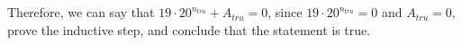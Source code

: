 \begin{enumerate}
\\
\\Therefore, we can say that $19\cdot20^{n_{tru}} + A_{tru} = 0$, since $19\cdot20^{n_{tru}} = 0$ and $A_{tru} = 0$, prove the inductive step, and conclude that the statement is true.
\\
\\\boxed{}
    
\end{enumerate}
    \vfill\vfill
\newpage
